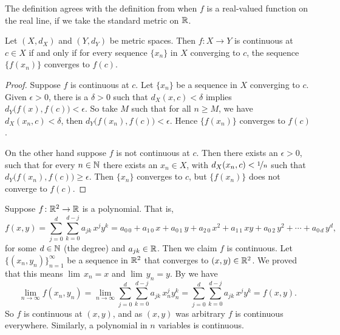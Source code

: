 The definition agrees with the definition from  when
$f$ is a real-valued function on the real line, if we take the standard
metric on ${\mathbb{R}}$.

\begin{prop} \label{prop:contiscont}
Let $(X,d_X)$ and $(Y,d_Y)$ be metric spaces.
Then $f \colon X \to Y$ is
continuous at $c \in X$
if and only if for every sequence $\{ x_n \}$ in $X$
converging to $c$, the sequence $\{ f(x_n) \}$ converges
to $f(c)$.
\end{prop}

\begin{proof}
Suppose $f$ is continuous at $c$.  Let $\{ x_n \}$ be a
sequence in $X$ converging to $c$.  Given $\epsilon > 0$,
there is a $\delta > 0$ such that $d_X(x,c) < \delta$ implies
$d_Y\bigl(f(x),f(c)\bigr) < \epsilon$.  So take $M$ such that
for all $n \geq M$, we have $d_X(x_n,c) < \delta$, then
$d_Y\bigl(f(x_n),f(c)\bigr) < \epsilon$.  Hence $\{ f(x_n) \}$
converges to $f(c)$.

On the other hand suppose $f$ is not continuous at $c$.
Then there exists an $\epsilon > 0$,
such that for every $n \in {\mathbb{N}}$ there exists an $x_n \in X$,
with
$d_X(x_n,c) < \nicefrac{1}{n}$ such that $d_Y\bigl(f(x_n),f(c)\bigr) \geq
\epsilon$.  Then $\{ x_n \}$ converges to $c$, but $\{ f(x_n) \}$
does not converge to $f(c)$.
\end{proof}

\begin{example}
Suppose $f \colon {\mathbb{R}}^2 \to {\mathbb{R}}$ is a polynomial.  That is,
\begin{equation*}
f(x,y) =
\sum_{j=0}^d
\sum_{k=0}^{d-j}
a_{jk}\,x^jy^k =
a_{0\,0} + a_{1\,0} \, x +
a_{0\,1} \, y+  
a_{2\,0} \, x^2+  
a_{1\,1} \, xy+  
a_{0\,2} \, y^2+ \cdots +
a_{0\,d} \, y^d ,
\end{equation*}
for some $d \in {\mathbb{N}}$ (the degree) and $a_{jk} \in {\mathbb{R}}$.  Then we claim 
$f$ is continuous.  Let $\{ (x_n,y_n) \}_{n=1}^\infty$ be a sequence
in ${\mathbb{R}}^2$ that converges to $(x,y) \in {\mathbb{R}}^2$.  We proved that this
means $\lim\, x_n = x$ and $\lim\, y_n = y$.
By  we have
\begin{equation*}
\lim_{n\to\infty}
f(x_n,y_n) =
\lim_{n\to\infty}
\sum_{j=0}^d
\sum_{k=0}^{d-j}
a_{jk} \, x_n^jy_n^k 
=
\sum_{j=0}^d
\sum_{k=0}^{d-j}
a_{jk} \, x^jy^k
=
f(x,y) .
\end{equation*}
So $f$ is continuous at $(x,y)$, and as $(x,y)$ was arbitrary $f$ is
continuous everywhere.  Similarly, a
polynomial in $n$ variables is continuous.
\end{example}

